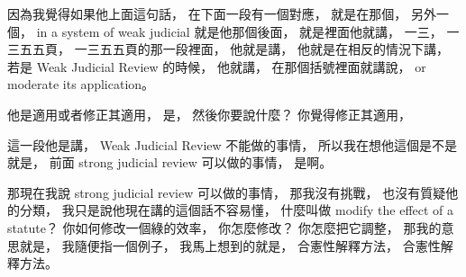 \hypertarget{w06:cue:556}{}因為我覺得如果他上面這句話，
\hypertarget{w06:cue:557}{}在下面一段有一個對應，
\hypertarget{w06:cue:558}{}就是在那個，
\hypertarget{w06:cue:559}{}另外一個，
\hypertarget{w06:cue:560}{}in a system of weak judicial
\hypertarget{w06:cue:561}{}就是他那個後面，
\hypertarget{w06:cue:562}{}就是裡面他就講，
\hypertarget{w06:cue:563}{}一三，
\hypertarget{w06:cue:564}{}一三五五頁，
\hypertarget{w06:cue:565}{}一三五五頁的那一段裡面，
\hypertarget{w06:cue:566}{}他就是講，
\hypertarget{w06:cue:567}{}他就是在相反的情況下講，
\hypertarget{w06:cue:568}{}若是 Weak Judicial Review 的時候，
\hypertarget{w06:cue:569}{}他就講，
\hypertarget{w06:cue:570}{}在那個括號裡面就講說，
\hypertarget{w06:cue:571}{}or moderate its application。

\hypertarget{w06:cue:572}{}他是適用或者修正其適用，
\hypertarget{w06:cue:573}{}是，
\hypertarget{w06:cue:574}{}然後你要說什麼？
\hypertarget{w06:cue:575}{}你覺得修正其適用，

\hypertarget{w06:cue:576}{}這一段他是講，
\hypertarget{w06:cue:577}{}Weak Judicial Review
\hypertarget{w06:cue:578}{}不能做的事情，
\hypertarget{w06:cue:579}{}所以我在想他這個是不是就是，
\hypertarget{w06:cue:580}{}前面 strong judicial review 可以做的事情，
\hypertarget{w06:cue:581}{}是啊。

\hypertarget{w06:cue:582}{}那現在我說 strong judicial review 可以做的事情，
\hypertarget{w06:cue:583}{}那我沒有挑戰，
\hypertarget{w06:cue:584}{}也沒有質疑他的分類，
\hypertarget{w06:cue:585}{}我只是說他現在講的這個話不容易懂，
\hypertarget{w06:cue:586}{}什麼叫做 modify the effect of a statute？
\hypertarget{w06:cue:587}{}你如何修改一個綠的效率，
\hypertarget{w06:cue:588}{}你怎麼修改？
\hypertarget{w06:cue:589}{}你怎麼把它調整，
\hypertarget{w06:cue:590}{}那我的意思就是，
\hypertarget{w06:cue:591}{}我隨便指一個例子，
\hypertarget{w06:cue:592}{}我馬上想到的就是，
\hypertarget{w06:cue:593}{}合憲性解釋方法，
\hypertarget{w06:cue:594}{}合憲性解釋方法。

